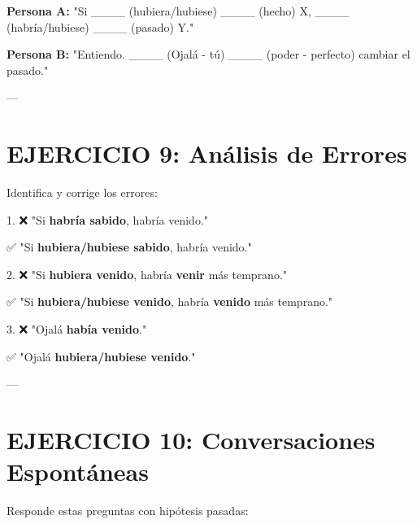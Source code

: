 \documentclass[a4paper,11pt]{article}
\begin{document}
\vspace{0.2cm}

\textbf{Persona A:} "Si ____ (hubiera/hubiese) ____ (hecho) X, ____ (habría/hubiese) ____ (pasado) Y."

\textbf{Persona B:} "Entiendo. ____ (Ojalá - tú) ____ (poder - perfecto) cambiar el pasado."

\vspace{0.2cm}

---

\vspace{0.2cm}

\section{EJERCICIO 9: Análisis de Errores}

\vspace{0.2cm}

Identifica y corrige los errores:

\vspace{0.2cm}

1. ❌ "Si \textbf{habría sabido}, habría venido."

✅ "Si \textbf{hubiera/hubiese sabido}, habría venido."

\vspace{0.2cm}

2. ❌ "Si \textbf{hubiera venido}, habría \textbf{venir} más temprano."

✅ "Si \textbf{hubiera/hubiese venido}, habría \textbf{venido} más temprano."

\vspace{0.2cm}

3. ❌ "Ojalá \textbf{había venido}."

✅ "Ojalá \textbf{hubiera/hubiese venido}."

\vspace{0.2cm}

---

\vspace{0.2cm}

\section{EJERCICIO 10: Conversaciones Espontáneas}

\vspace{0.2cm}

Responde estas preguntas con hipótesis pasadas:

\vspace{0.2cm}
\end{document}
